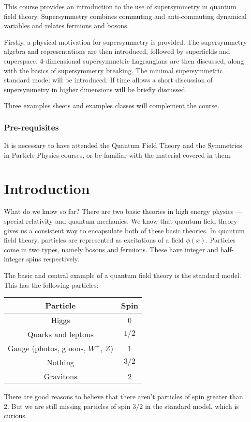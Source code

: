 \documentclass[a4paper]{article}
\begin{document}
\maketitle
{\small
\setlength{\parindent}{0em}
\setlength{\parskip}{1em}
This course provides an introduction to the use of supersymmetry in quantum field theory. Supersymmetry combines commuting and anti-commuting dynamical variables and relates fermions and bosons.

Firstly, a physical motivation for supersymmetry is provided. The supersymmetry algebra and representations are then introduced, followed by superfields and superspace. 4-dimensional supersymmetric Lagrangians are then discussed, along with the basics of supersymmetry breaking. The minimal supersymmetric standard model will be introduced. If time allows a short discussion of supersymmetry in higher dimensions will be briefly discussed.

Three examples sheets and examples classes will complement the course.
\subsubsection*{Pre-requisites}
It is necessary to have attended the Quantum Field Theory and the Symmetries in Particle Physics courses, or be familiar with the material covered in them.
}
\tableofcontents

\section{Introduction}
What do we know so far? There are two basic theories in high energy physics --- special relativity and quantum mechanics. We know that quantum field theory gives us a consistent way to encapsulate both of these basic theories. In quantum field theory, particles are represented as excitations of a field $\phi(x)$. Particles come in two types, namely bosons and fermions. These have integer and half-integer spins respectively.

The basic and central example of a quantum field theory is the standard model. This has the following particles:
\begin{center}
  \begin{tabular}{cc}
    \toprule
    Particle & Spin\\
    \midrule
    Higgs & 0\\
    Quarks and leptons & $1/2$\\
    Gauge (photos, gluons, $W^{\pm}$, $Z$) & 1\\
    Nothing & $3/2$\\
    Gravitons & 2\\
    \bottomrule
  \end{tabular}
\end{center}
There are good reasons to believe that there aren't particles of spin greater than $2$. But we are still missing particles of spin $3/2$ in the standard model, which is curious.
\end{document}
